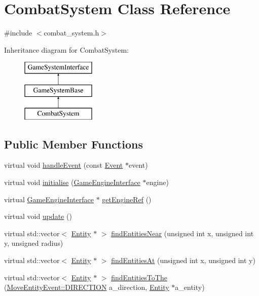 \hypertarget{classCombatSystem}{\section{Combat\-System Class Reference}
\label{classCombatSystem}
}


{\ttfamily \#include $<$combat\-\_\-system.\-h$>$}

Inheritance diagram for Combat\-System\-:\begin{figure}[H]
\begin{center}
\leavevmode
\includegraphics[height=3.000000cm]{classCombatSystem}
\end{center}
\end{figure}
\subsection*{Public Member Functions}
\begin{DoxyCompactItemize}
\item 
virtual void \hyperlink{classCombatSystem_afba5db4bb69a947c3a2303005f74d5d7}{handle\-Event} (const \hyperlink{classEvent}{Event} $\ast$event)
\item 
virtual void \hyperlink{classGameSystemBase_a55b4fc27cbfccd3c724c2e5984d78625}{initialise} (\hyperlink{classGameEngineInterface}{Game\-Engine\-Interface} $\ast$engine)
\item 
virtual \hyperlink{classGameEngineInterface}{Game\-Engine\-Interface} $\ast$ \hyperlink{classGameSystemBase_a1954c5a1c79963554805bc25b2cd6072}{get\-Engine\-Ref} ()
\item 
virtual void \hyperlink{classGameSystemBase_a039d3086ac7fe50abdb110b569520d69}{update} ()
\item 
virtual std\-::vector$<$ \hyperlink{classEntity}{Entity} $\ast$ $>$ \hyperlink{classGameSystemBase_aae270a88f1077a091e6033514b889abd}{find\-Entities\-Near} (unsigned int x, unsigned int y, unsigned radius)
\item 
virtual std\-::vector$<$ \hyperlink{classEntity}{Entity} $\ast$ $>$ \hyperlink{classGameSystemBase_a7aa9912fc078d990dbfb480e411bd3bc}{find\-Entities\-At} (unsigned int x, unsigned int y)
\item 
virtual std\-::vector$<$ \hyperlink{classEntity}{Entity} $\ast$ $>$ \hyperlink{classGameSystemBase_a44456ef40ac565b9d6b65f3b1531a4ef}{find\-Entities\-To\-The} (\hyperlink{classMoveEntityEvent_a7058a943643bee9164a21e62e3392807}{Move\-Entity\-Event\-::\-D\-I\-R\-E\-C\-T\-I\-O\-N} a\-\_\-direction, \hyperlink{classEntity}{Entity} $\ast$a\-\_\-entity)
\end{DoxyCompactItemize}

